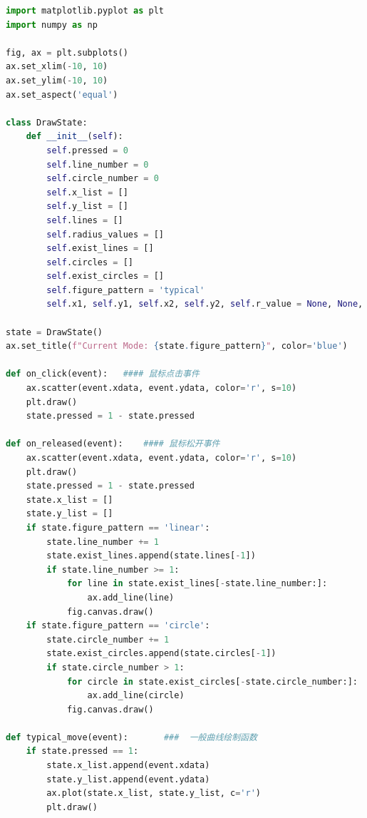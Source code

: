 \documentclass[12pt]{article}
\begin{document}
\begin{lstlisting}[language=Python]
import matplotlib.pyplot as plt
import numpy as np

fig, ax = plt.subplots()
ax.set_xlim(-10, 10)
ax.set_ylim(-10, 10)
ax.set_aspect('equal')

class DrawState:
    def __init__(self):
        self.pressed = 0
        self.line_number = 0
        self.circle_number = 0
        self.x_list = []
        self.y_list = []
        self.lines = []
        self.radius_values = []
        self.exist_lines = []
        self.circles = []
        self.exist_circles = []
        self.figure_pattern = 'typical'
        self.x1, self.y1, self.x2, self.y2, self.r_value = None, None, None, None, None

state = DrawState()
ax.set_title(f"Current Mode: {state.figure_pattern}", color='blue')

def on_click(event):   #### 鼠标点击事件
    ax.scatter(event.xdata, event.ydata, color='r', s=10)
    plt.draw()
    state.pressed = 1 - state.pressed

def on_released(event):    #### 鼠标松开事件
    ax.scatter(event.xdata, event.ydata, color='r', s=10)
    plt.draw()
    state.pressed = 1 - state.pressed
    state.x_list = []
    state.y_list = []
    if state.figure_pattern == 'linear':
        state.line_number += 1
        state.exist_lines.append(state.lines[-1])
        if state.line_number >= 1:
            for line in state.exist_lines[-state.line_number:]:
                ax.add_line(line)
            fig.canvas.draw()
    if state.figure_pattern == 'circle':
        state.circle_number += 1
        state.exist_circles.append(state.circles[-1])
        if state.circle_number > 1:
            for circle in state.exist_circles[-state.circle_number:]:
                ax.add_line(circle)
            fig.canvas.draw()

def typical_move(event):       ###  一般曲线绘制函数
    if state.pressed == 1:
        state.x_list.append(event.xdata)
        state.y_list.append(event.ydata)
        ax.plot(state.x_list, state.y_list, c='r')
        plt.draw()


\end{lstlisting}
\end{document}
